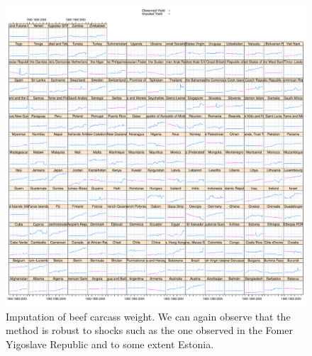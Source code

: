 \documentclass[nojss]{jss}\usepackage[]{graphicx}\usepackage[]{color}
\makeatletter
\def\maxwidth{ %
  \ifdim\Gin@nat@width>\linewidth
    \linewidth
  \else
    \Gin@nat@width
  \fi
}
\newenvironment{knitrout}{}{} %
\makeatother
\begin{document}
\begin{knitrout}
\color{fgcolor}\begin{figure}[!ht]


{\centering \includegraphics[width=\maxwidth]{figure/beef-yield-imputed} 

}

\caption[Imputation of beef carcass weight]{Imputation of beef carcass weight. We can again observe that the method is robust to shocks such as the one observed in the Fomer Yigoslave Republic and to some extent Estonia.\label{fig:beef-yield-imputed}}
\end{figure}


\end{knitrout}
\end{document}
